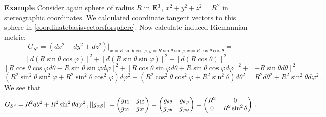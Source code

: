 \documentclass[12pt]{article}
\theoremstyle{theorem}
\numberwithin{equation}{section}
\begin{document}
\smallskip
{\bf Example}
Consider again sphere of radius $R$  in ${\bf E}^3$,
$x^2+y^2+z^2=R^2$ in stereographic coordinates.
 We calculated coordinate tangent vectors to this sphere
in \eqref{coordinatebasisvectorsforsphere}. Now
calculate induced Riemannian metric:
            $$
     G_{S^2}=\left(
    dx^2+dy^2+dz^2\right)
        \big\vert_
{x=R\sin\theta\cos\varphi,
  y=R\sin\theta\sin\varphi,
   x=R\cos\theta\cos\theta
      }=
             $$
             $$
  \left[d(R\sin\theta\cos\varphi)\right]^2+
  \left[d(R\sin\theta\sin\varphi)\right]^2+
  \left[d(R\cos\theta)\right]^2=
             $$
             $$
  \left[
  R\cos\theta\cos\varphi d\theta
   -R\sin\theta\sin\varphi d\varphi\right]^2+
  \left[
  R\cos\theta\sin\varphi d\theta
   +R\sin\theta\cos\varphi d\varphi\right]^2+
  \left[-R\sin\theta d\theta\right]^2=
            $$
       $$
    (R^2\sin^2\theta\sin^2\varphi+
  R^2\sin^2\theta\cos^2\varphi)d\varphi^2+
   (R^2\cos^2\theta\cos^2\varphi+R^2\sin^2\theta)
      d\theta^2=R^2d\theta^2+R^2\sin^2\theta d\varphi^2\,. 
      $$
We see that
 \begin{equation}\label{riemmetriconsphere}
  G_{S^2}=R^2d\theta^2+R^2\sin^2\theta d\varphi^2\,,
             ||g_{\alpha\beta}||=
       \begin{pmatrix}
        g_{11}&
        g_{12}\cr
        g_{21}&
        g_{22}\cr
       \end{pmatrix}=
       \begin{pmatrix}
        g_{\theta\theta}&
        g_{\theta\varphi}\cr
        g_{\varphi\theta}&
        g_{\varphi\varphi}\cr
       \end{pmatrix}=
       \begin{pmatrix}
        R^2&
        0\cr
        0&
        R^2\sin^2\theta\cr
       \end{pmatrix}\,.
 \end{equation}

\medskip
\end{document}
